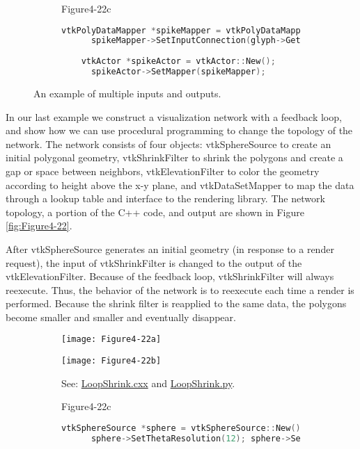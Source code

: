\begin{description}[leftmargin=0cm,labelindent=0cm]
\begin{figure}[htb]
\begin{subfigure}[h]{0.96\linewidth}{Figure4-22c}
\begin{lstlisting}[language=C++, caption={Warped Sphere.}]
    vtkPolyDataMapper *spikeMapper = vtkPolyDataMapper::New();
      spikeMapper->SetInputConnection(glyph->GetOutputPort());
    
    vtkActor *spikeActor = vtkActor::New();
      spikeActor->SetMapper(spikeMapper);
    \end{lstlisting}
    \caption*{}
  \end{subfigure}
  \caption{An example of multiple inputs and outputs.}\label{fig:Figure4-21}
\end{figure}

\item[Disappearing Sphere.] In our last example we construct a visualization network with a feedback loop, and show how we can use procedural programming to change the topology of the network. The network consists of four objects: vtkSphereSource to create an initial polygonal geometry, vtkShrinkFilter to shrink the polygons and create a gap or space between neighbors, vtkElevationFilter to color the geometry according to height above the x-y plane, and vtkDataSetMapper to map the data through a lookup table and interface to the rendering library. The network topology, a portion of the C++ code, and output are shown in Figure \ref{fig:Figure4-22}.

After vtkSphereSource generates an initial geometry (in response to a render request), the input of vtkShrinkFilter is changed to the output of the vtkElevationFilter. Because of the feedback loop, vtkShrinkFilter will always reexecute. Thus, the behavior of the network is to reexecute each time a render is performed. Because the shrink filter is reapplied to the same data, the polygons become smaller and smaller and eventually disappear.

\begin{figure}[htb]
  \begin{subfigure}[h]{0.48\linewidth}
    \texttt{[image: Figure4-22a]}
    \caption*{}
    \label{fig:Figure4-22a}
  \end{subfigure}
  \hfill
  \begin{subfigure}[h]{0.48\linewidth}
    \texttt{[image: Figure4-22b]}
    \caption*{See: \href{https://lorensen.github.io/VTKExamples/site/Cxx/Visualization/LoopShrink/}{LoopShrink.cxx} and \href{https://lorensen.github.io/VTKExamples/site/Python/Visualization/LoopShrink/}{LoopShrink.py}.}
    \label{fig:Figure4-22b}
  \end{subfigure}
  \hfill
  \begin{subfigure}[h]{0.96\linewidth}{Figure4-22c}
    \begin{lstlisting}[language=C++, caption={Warped Sphere.}, escapechar=\$]
    vtkSphereSource *sphere = vtkSphereSource::New();
      sphere->SetThetaResolution(12); sphere->SetPhiResolution(12);
    

\end{lstlisting}
\end{subfigure}
\end{figure}
\end{description}
